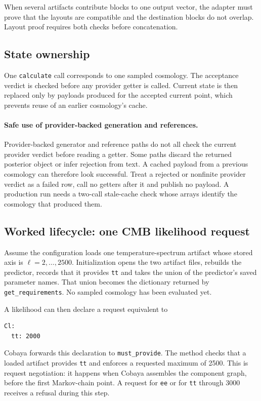 \documentclass[10pt,aps,prd,twocolumn,nofootinbib]{revtex4-2}
\newcommand{\code}[1]{\texttt{#1}}
\begin{document}
When several artifacts contribute blocks to one output vector, the adapter
must prove that the layouts are compatible and the destination blocks do not
overlap.  Layout proof requires both checks before concatenation.

\subsection{State ownership}

One \code{calculate} call corresponds to one sampled cosmology.  The
acceptance verdict is checked before any provider getter is called.  Current
state is then replaced only by payloads produced for the accepted current
point, which prevents reuse of an earlier cosmology's cache.

\paragraph{Safe use of provider-backed generation and references.}
Provider-backed generator and reference paths do not all check the current
provider verdict before reading a getter.  Some paths discard the returned
posterior object or infer rejection from text.  A cached payload from a
previous cosmology can therefore look successful.  Treat a rejected or
nonfinite provider verdict as a failed row, call no getters after it and
publish no payload.  A production run needs a two-call stale-cache check whose
arrays identify the cosmology that produced them.

\subsection{Worked lifecycle: one CMB likelihood request}

Assume the configuration loads one temperature-spectrum artifact whose stored
axis is $\ell=2,\ldots,2500$.  Initialization opens the two artifact files,
rebuilds the predictor, records that it provides \code{tt} and takes the
union of the predictor's saved parameter names.  That union becomes the
dictionary returned by \code{get\_requirements}.  No sampled cosmology has
been evaluated yet.

A likelihood can then declare a request equivalent to
\begin{verbatim}
Cl:
  tt: 2000
\end{verbatim}
Cobaya forwards this declaration to \code{must\_provide}.  The method checks
that a loaded artifact provides \code{tt} and enforces a requested maximum of
2500.  This is request negotiation: it happens when Cobaya assembles
the component graph, before the first Markov-chain point.  A request for
\code{ee} or for \code{tt} through 3000 receives a refusal during this step.
\end{document}
